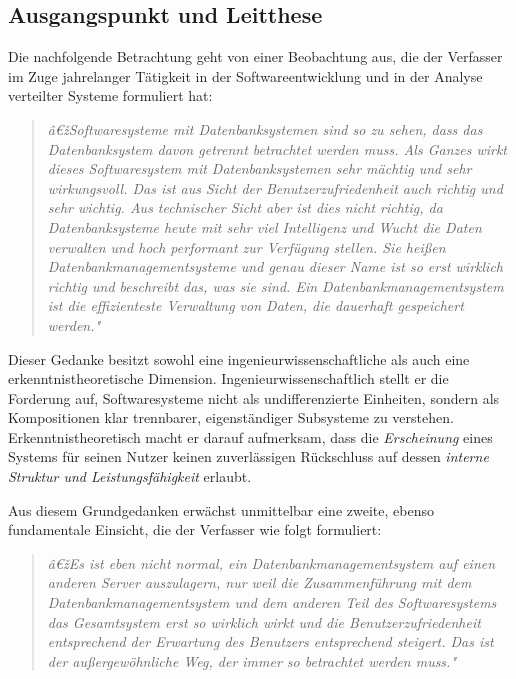 ﻿\documentclass[a4paper,12pt]{article}
\theoremstyle{definition}
\begin{document}
\subsection{Ausgangspunkt und Leitthese}

Die nachfolgende Betrachtung geht von einer Beobachtung aus, die der Verfasser im Zuge jahrelanger Tätigkeit in der Softwareentwicklung und in der Analyse verteilter Systeme formuliert hat:

\begin{quote}
\textit{â€žSoftwaresysteme mit Datenbanksystemen sind so zu sehen, dass das Datenbanksystem davon getrennt betrachtet werden muss. Als Ganzes wirkt dieses Softwaresystem mit Datenbanksystemen sehr mächtig und sehr wirkungsvoll. Das ist aus Sicht der Benutzerzufriedenheit auch richtig und sehr wichtig. Aus technischer Sicht aber ist dies nicht richtig, da Datenbanksysteme heute mit sehr viel Intelligenz und Wucht die Daten verwalten und hoch performant zur Verfügung stellen. Sie heißen Datenbankmanagementsysteme und genau dieser Name ist so erst wirklich richtig und beschreibt das, was sie sind. Ein Datenbankmanagementsystem ist die effizienteste Verwaltung von Daten, die dauerhaft gespeichert werden."}
\end{quote}

Dieser Gedanke besitzt sowohl eine ingenieurwissenschaftliche als auch eine erkenntnistheoretische Dimension. Ingenieurwissenschaftlich stellt er die Forderung auf, Softwaresysteme nicht als undifferenzierte Einheiten, sondern als Kompositionen klar trennbarer, eigenständiger Subsysteme zu verstehen. Erkenntnistheoretisch macht er darauf aufmerksam, dass die \emph{Erscheinung} eines Systems für seinen Nutzer keinen zuverlässigen Rückschluss auf dessen \emph{interne Struktur und Leistungsfähigkeit} erlaubt.

Aus diesem Grundgedanken erwächst unmittelbar eine zweite, ebenso fundamentale Einsicht, die der Verfasser wie folgt formuliert:

\begin{quote}
\textit{â€žEs ist eben nicht normal, ein Datenbankmanagementsystem auf einen anderen Server auszulagern, nur weil die Zusammenführung mit dem Datenbankmanagementsystem und dem anderen Teil des Softwaresystems das Gesamtsystem erst so wirklich wirkt und die Benutzerzufriedenheit entsprechend der Erwartung des Benutzers entsprechend steigert. Das ist der außergewöhnliche Weg, der immer so betrachtet werden muss."}
\end{quote}
\end{document}

